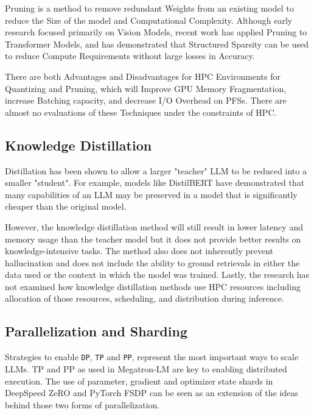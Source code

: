 Pruning is a method to remove redundant Weights from an existing model to reduce the Size of the model and Computational Complexity. Although early research focused primarily on Vision Models, recent work has applied Pruning to Transformer Models, and has demonstrated that Structured Sparsity can be used to reduce Compute Requirements without large losses in Accuracy.

There are both Advantages and Disadvantages for HPC Environments for Quantizing and Pruning, which will Improve GPU Memory Fragmentation, increase Batching capacity, and decrease I/O Overhead on \acp{PFS}. There are almost no evaluations of these Techniques under the constraints of HPC.

\subsection{Knowledge Distillation}

Distillation has been shown to allow a larger "teacher" LLM to be reduced into a smaller "student". For example, models like DistilBERT \cite{sanh2019distilbert} have demonstrated that many capabilities of an LLM may be preserved in a model that is significantly cheaper than the original model. 

However, the knowledge distillation method will still result in lower latency and memory usage than the teacher model but it does not provide better results on knowledge-intensive tasks. The method also does not inherently prevent hallucination and does not include the ability to ground retrievals in either the data used or the context in which the model was trained. Lastly, the research has not examined how knowledge distillation methods use HPC resources including allocation of those resources, scheduling, and distribution during inference.

\subsection{Parallelization and Sharding}

Strategies to enable \texttt{\ac{DP}}, \texttt{\ac{TP}} and \texttt{\ac{PP}}, represent the most important ways to scale LLMs. \ac{TP} and \ac{PP} as used in Megatron-LM \cite{shoeybi2019megatron} are key to enabling distributed execution. The use of parameter, gradient and optimizer state shards in DeepSpeed ZeRO \cite{rajbhandari2020deepspeed} and PyTorch \ac{FSDP} can be seen as an extension of the ideas behind those two forms of parallelization. 

